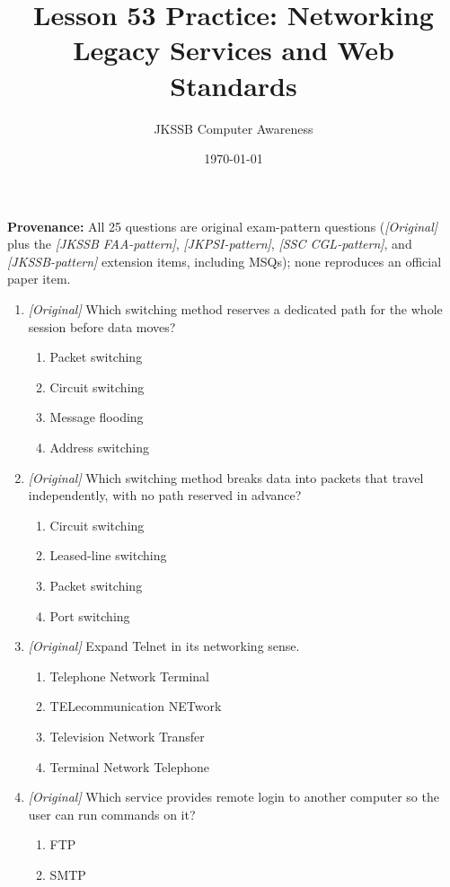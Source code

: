 \documentclass[11pt]{article}
\title{Lesson 53 Practice: Networking Legacy Services and Web Standards}
\author{JKSSB Computer Awareness}
\date{\today}
\begin{document}
\maketitle
\noindent\textbf{Provenance:} All 25 questions are original exam-pattern questions (\textit{[Original]} plus the \textit{[JKSSB FAA-pattern]}, \textit{[JKPSI-pattern]}, \textit{[SSC CGL-pattern]}, and \textit{[JKSSB-pattern]} extension items, including MSQs); none reproduces an official paper item.

\begin{enumerate}[label=\textbf{Q\arabic*.}, leftmargin=*]
\item \textit{[Original]} Which switching method reserves a dedicated path
  for the whole session before data moves?
  \begin{enumerate}[label=\Alph*.]
    \item Packet switching
    \item Circuit switching
    \item Message flooding
    \item Address switching
  \end{enumerate}
\item \textit{[Original]} Which switching method breaks data into packets
  that travel independently, with no path reserved in advance?
  \begin{enumerate}[label=\Alph*.]
    \item Circuit switching
    \item Leased-line switching
    \item Packet switching
    \item Port switching
  \end{enumerate}
\item \textit{[Original]} Expand Telnet in its networking sense.
  \begin{enumerate}[label=\Alph*.]
    \item Telephone Network Terminal
    \item TELecommunication NETwork
    \item Television Network Transfer
    \item Terminal Network Telephone
  \end{enumerate}
\item \textit{[Original]} Which service provides remote login to another
  computer so the user can run commands on it?
  \begin{enumerate}[label=\Alph*.]
    \item FTP
    \item SMTP

\end{enumerate}
\end{enumerate}
\end{document}
